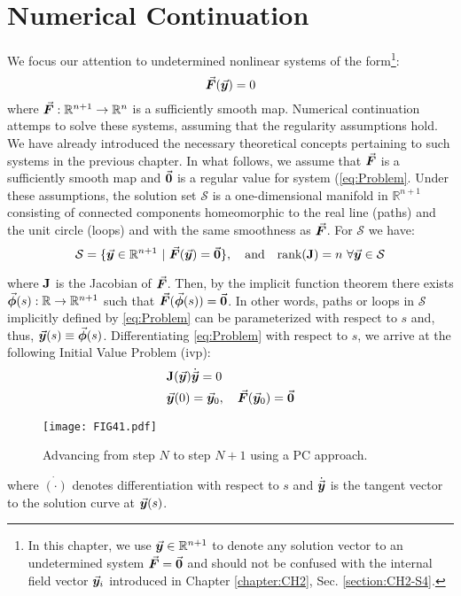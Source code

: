 \section{Numerical Continuation}
We focus our attention to undetermined nonlinear systems of the 
form\footnote{In this chapter, we use $\vec{\bm{y}}\in\mathbb{R}^{n+1}$ to denote 
any solution vector to an undetermined system $\vec{\bm{F}}=\vec{\bm{0}}$ and should 
not be confused with the internal field vector $\vec{\bm{y}}_i$ introduced in 
Chapter \ref{chapter:CH2}, Sec. \ref{section:CH2-S4}.}:
\begin{equation}
	\vec{\bm{F}}(\vec{\bm{y}})=0
	\label{eq:Problem}
\end{equation}
where $\vec{\bm{F}}:\mathbb{R}^{n+1}\rightarrow\mathbb{R}^n$ is a sufficiently 
smooth
map. Numerical continuation attemps to solve these systems, assuming that the 
regularity assumptions hold. We have already introduced the necessary 
theoretical concepts pertaining to such systems in the previous chapter. In 
what follows, we assume that $\vec{\bm{F}}$ is a sufficiently smooth map and 
$\vec{\bm{0}}$ is a regular value for system (\ref{eq:Problem}. Under these 
assumptions, the solution set
$\mathcal{S}$ is a one-dimensional manifold in
$\mathbb{R}^{n+1}$ consisting of connected components homeomorphic to the real
line (paths) and the unit circle (loops) and with the same smoothness as
$\vec{\bm{F}}$. For $\mathcal{S}$ we have:
\begin{equation}
	\mathcal{S}=\{\bvec{y}\in\mathbb{R}^{n+1}\ |\ 
	\bvec{F}(\bvec{y})=\bvec{0}\},\quad \text{and}\quad 
	\text{rank}(\bmat{J})=n\ \forall\bvec{y}\in\mathcal{S}
	\label{eq:SolutionSet}
\end{equation}

\noindent where $\mathbf{J}$ is the Jacobian of $\vec{\bm{F}}$. Then,  by the 
implicit
function theorem there exists 
$\vec{\bm{\phi}}(s):\mathbb{R}\rightarrow\mathbb{R}^{n+1}$
such that $\vec{\bm{F}}(\vec{\bm{\phi}}(s))=\vec{\bm{0}}$. In other words, paths or loops in
$\mathcal{S}$ implicitly defined by \ref{eq:Problem} can be parameterized with
respect to $s$ and, thus, $\vec{\bm{y}}(s)\equiv\vec{\bm{\phi}}(s)$. Differentiating 
\ref{eq:Problem} with respect to $s$, we arrive
at the following Initial Value Problem (\acrshort{ivp}):
\begin{subequations}
	\begin{align}
		&\mathbf{J}(\vec{\bm{y}})\dot{\vec{\bm{y}}}=0\label{eq:IVP1}\\
		&\vec{\bm{y}}(0)=\vec{\bm{y}}_0,\quad \vec{\bm{F}}(\vec{\bm{y}}_0)=\vec{\bm{0}}	
		\label{eq:IVP2}
	\end{align}
	\label{eq:IVP}
\end{subequations}
\begin{figure}[t]
	\centering
	\texttt{[image: FIG41.pdf]}
	\caption{Advancing from step $N$ to step $N+1$ using a PC approach.}
	\label{fig:FIG41}
\end{figure}
where $\dot{(\cdot)}$ denotes differentiation with respect to $s$ and 
$\dot{\vec{\bm{y}}}$ is the tangent vector to the solution curve at $\vec{\bm{y}}(s)$. 


